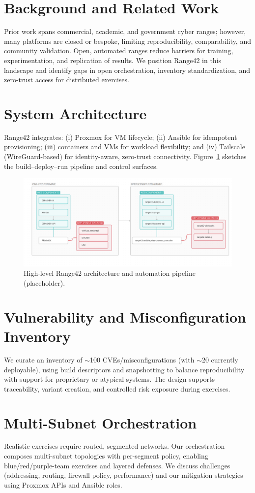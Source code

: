 \documentclass[11pt]{article}
\begin{document}
\section{Background and Related Work}
Prior work spans commercial, academic, and government cyber ranges; however, many platforms are closed or bespoke, limiting reproducibility, comparability, and community validation. Open, automated ranges reduce barriers for training, experimentation, and replication of results. We position Range42 in this landscape and identify gaps in open orchestration, inventory standardization, and zero-trust access for distributed exercises.

\section{System Architecture}
Range42 integrates: (i) Proxmox for VM lifecycle; (ii) Ansible for idempotent provisioning; (iii) containers and VMs for workload flexibility; and (iv) Tailscale (WireGuard-based) for identity-aware, zero-trust connectivity. Figure~\ref{fig:arch} sketches the build--deploy--run pipeline and control surfaces.
\begin{figure}[h]
\centering
\includegraphics[width=0.9\linewidth]{images/diagrams/architecture.png}
\caption{High-level Range42 architecture and automation pipeline (placeholder).}
\label{fig:arch}
\end{figure}

\section{Vulnerability and Misconfiguration Inventory}
We curate an inventory of $\sim$100 CVEs/misconfigurations (with $\sim$20 currently deployable), using build descriptors and snapshotting to balance reproducibility with support for proprietary or atypical systems. The design supports traceability, variant creation, and controlled risk exposure during exercises.

\section{Multi-Subnet Orchestration}
Realistic exercises require routed, segmented networks. Our orchestration composes multi-subnet topologies with per-segment policy, enabling blue/red/purple-team exercises and layered defenses. We discuss challenges (addressing, routing, firewall policy, performance) and our mitigation strategies using Proxmox APIs and Ansible roles.
\end{document}

